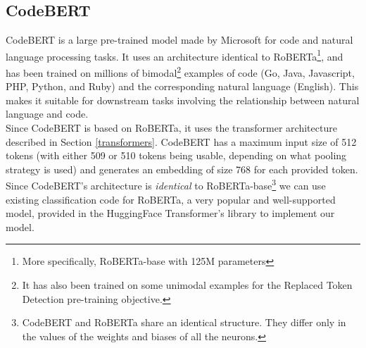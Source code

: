 \subsection{CodeBERT}
CodeBERT \cite{CodeBERT} is a large pre-trained model made by Microsoft for code and natural language processing tasks. It uses an architecture identical to RoBERTa\footnote{More specifically, RoBERTa-base with 125M parameters}, and has been trained on millions of bimodal\footnote{It has also been trained on some unimodal examples for the Replaced Token Detection pre-training objective.} examples of code (Go, Java, Javascript, PHP, Python, and Ruby) and the corresponding natural language (English). This makes it suitable for downstream tasks involving the relationship between natural language and code. \\

\noindent
Since CodeBERT is based on RoBERTa, it uses the transformer architecture described in Section \ref{transformers}. CodeBERT has a maximum input size of 512 tokens (with either 509 or 510 tokens being usable, depending on what pooling strategy is used) and generates an embedding of size 768 for each provided token. \\



\noindent
Since CodeBERT's architecture is \emph{identical} to RoBERTa-base\footnote{CodeBERT and RoBERTa share an identical structure. They differ only in the values of the weights and biases of all the neurons.} we can use existing classification code for RoBERTa, a very popular and well-supported model, provided in the HuggingFace Transformer's library to implement our model.\\

